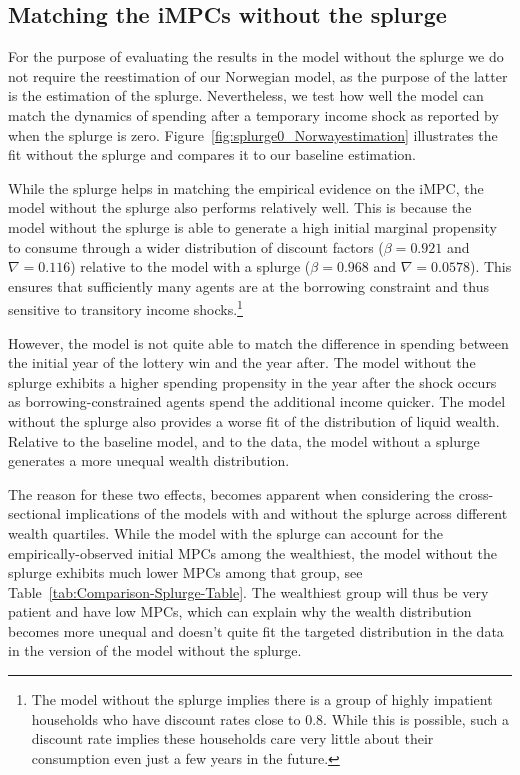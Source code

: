 \documentclass[\latexroot/\projectname]{subfiles}
\begin{document}
\subsection{Matching the iMPCs without the splurge}
\whenintegrated{\label{app:nosplurge-matching-impcs}} 

For the purpose of evaluating the results in the model without the splurge we do not require the reestimation of our Norwegian model, as the purpose of the latter is the estimation of the splurge. Nevertheless, we test how well the model can match the dynamics of spending after a temporary income shock as reported by~\cite{fagereng-mpc-2021} when the splurge is zero.
Figure~\ref{fig:splurge0_Norwayestimation} illustrates the fit without the splurge and compares it to our baseline estimation.



While the splurge helps in matching the empirical evidence on the iMPC, the model without the splurge also performs relatively well. This is because the model without the splurge is able to generate a high initial marginal propensity to consume through a wider distribution of discount factors ($\beta = 0.921$ and $\nabla=0.116$) relative to the model with a splurge ($\beta = 0.968$ and $\nabla=0.0578$). This ensures that sufficiently many agents are at the borrowing constraint and thus sensitive to transitory income shocks.\footnote{The model without the splurge implies there is a group of highly impatient households who have discount rates close to 0.8. While this is possible, such a discount rate implies these households care very little about their consumption even just a few years in the future.}

However, the model is not quite able to match the difference in spending between the initial year of the lottery win and the year after.
The model without the splurge exhibits a higher spending propensity in the year after the shock occurs as borrowing-constrained agents spend the additional income quicker.
The model without the splurge also provides a worse fit of the distribution of liquid wealth.
Relative to the baseline model, and to the data, the model without a splurge generates a more unequal wealth distribution.

The reason for these two effects, becomes apparent when considering the cross-sectional implications of the models with and without the splurge across different wealth quartiles.
While the model with the splurge can account for the empirically-observed initial MPCs among the wealthiest, the model without the splurge exhibits much lower MPCs among that group, see Table~\ref{tab:Comparison-Splurge-Table}. The wealthiest group will thus be very patient and have low MPCs, which can explain why the wealth distribution becomes more unequal and doesn't quite fit the targeted distribution in the data in the version of the model without the splurge.
\end{document}

